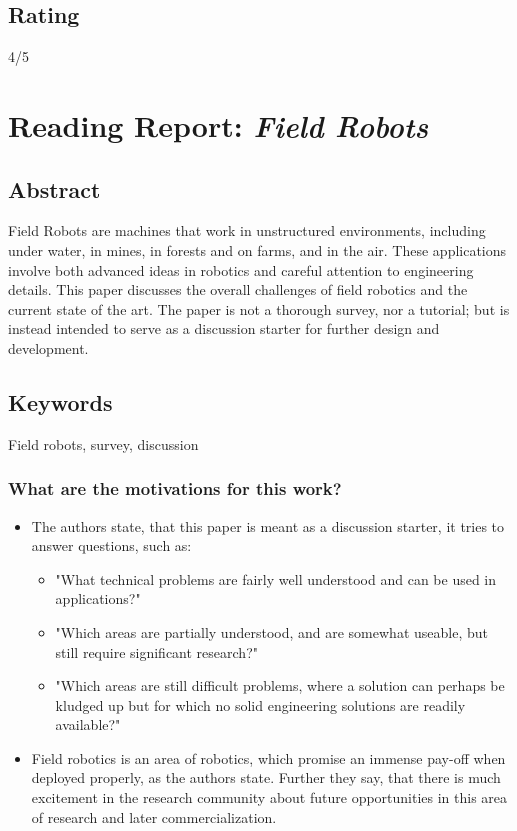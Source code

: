     \subsection*{Rating}
    4/5

    \newpage
    \section{Reading Report: \emph{Field Robots}}
    \cite{Thorpe2001}
    
    \subsection*{Abstract}
    Field Robots are machines that work in unstructured environments, including
    under water, in mines, in forests and on farms, and in the air. These applications
    involve both advanced ideas in robotics and careful attention to engineering
    details. This paper discusses the overall challenges of field robotics and the
    current state of the art. The paper is not a thorough survey, nor a tutorial; but is
    instead intended to serve as a discussion starter for further design and
    development.
    
    \subsection*{Keywords}
    Field robots, survey, discussion
    
     
    \subsubsection*{What are the motivations for this work?}
    \begin{itemize}
        \item The authors state, that this paper is meant as a discussion starter, it tries to answer questions, such as: \ \begin{itemize}
            \item "What technical problems are fairly well understood and can be used in applications?"
            \item "Which areas are partially understood, and are somewhat useable, but still require significant research?"
            \item "Which areas are still difficult problems, where a solution can perhaps be kludged up but for which no solid engineering solutions are readily available?"
        \end{itemize}
        \item Field robotics is an area of robotics, which promise an immense pay-off when deployed properly, as the authors state. Further they say, that there is much excitement in the research community about future opportunities in this area of research and later commercialization.
    \end{itemize}
